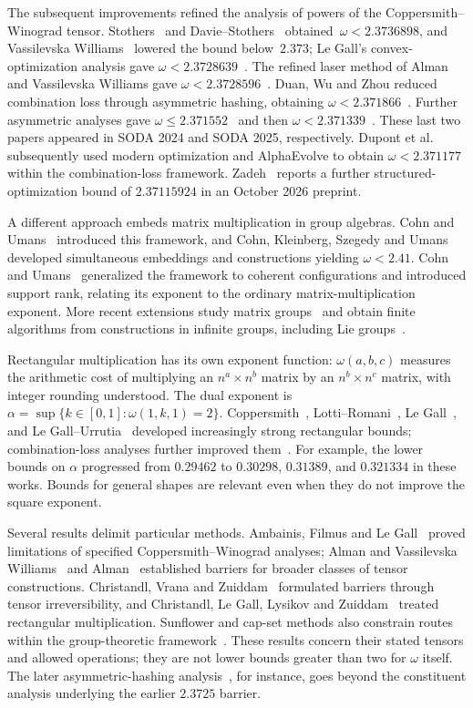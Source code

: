 \documentclass[11pt,letterpaper]{article}
\theoremstyle{definition}
\numberwithin{equation}{section}
\begin{document}
The subsequent improvements refined the analysis of powers of the Coppersmith--Winograd tensor. Stothers~\cite{Sto10} and Davie--Stothers~\cite{DS13} obtained~$\omega<2.3736898$, and Vassilevska Williams~\cite{VW12} lowered the bound below~$2.373$; Le Gall's convex-optimization analysis gave $\omega<2.3728639$~\cite{LG14}. The refined laser method of Alman and Vassilevska Williams gave $\omega<2.3728596$~\cite{AW21}. Duan, Wu and Zhou reduced combination loss through asymmetric hashing, obtaining $\omega<2.371866$~\cite{DWZ23}. Further asymmetric analyses gave $\omega\leq2.371552$~\cite{VXXZ24} and then $\omega<2.371339$~\cite{AD25}. These last two papers appeared in SODA 2024 and SODA 2025, respectively. Dupont et al.~\cite{Dup26} subsequently used modern optimization and AlphaEvolve to obtain $\omega<2.371177$ within the combination-loss framework. Zadeh~\cite{Zadeh26} reports a further structured-optimization bound of $2.37115924$ in an October 2026 preprint.

A different approach embeds matrix multiplication in group algebras. Cohn and Umans~\cite{CU03} introduced this framework, and Cohn, Kleinberg, Szegedy and Umans~\cite{CKSU05} developed simultaneous embeddings and constructions yielding $\omega<2.41$. Cohn and Umans~\cite{CU13} generalized the framework to coherent configurations and introduced support rank, relating its exponent to the ordinary matrix-multiplication exponent. More recent extensions study matrix groups~\cite{BCGPU23} and obtain finite algorithms from constructions in infinite groups, including Lie groups~\cite{BCGPU25}.

Rectangular multiplication has its own exponent function: $\omega(a,b,c)$ measures the arithmetic cost of multiplying an $n^a\times n^b$ matrix by an $n^b\times n^c$ matrix, with integer rounding understood. The dual exponent is $\alpha=\sup\{k\in[0,1]:\omega(1,k,1)=2\}$. Coppersmith~\cite{Cop82,Cop97}, Lotti--Romani~\cite{LR83}, Le Gall~\cite{LG12}, and Le Gall--Urrutia~\cite{LGU18} developed increasingly strong rectangular bounds; combination-loss analyses further improved them~\cite{LG24,VXXZ24,AD25}. For example, the lower bounds on $\alpha$ progressed from $0.29462$ to $0.30298$, $0.31389$, and $0.321334$ in these works. Bounds for general shapes are relevant even when they do not improve the square exponent.

Several results delimit particular methods. Ambainis, Filmus and Le Gall~\cite{AFL15} proved limitations of specified Coppersmith--Winograd analyses; Alman and Vassilevska Williams~\cite{AW18} and Alman~\cite{Alman21} established barriers for broader classes of tensor constructions. Christandl, Vrana and Zuiddam~\cite{CVZ21} formulated barriers through tensor irreversibility, and Christandl, Le Gall, Lysikov and Zuiddam~\cite{CGLZ25} treated rectangular multiplication. Sunflower and cap-set methods also constrain routes within the group-theoretic framework~\cite{ASU13,BCCGNSU17}. These results concern their stated tensors and allowed operations; they are not lower bounds greater than two for $\omega$ itself. The later asymmetric-hashing analysis~\cite{DWZ23}, for instance, goes beyond the constituent analysis underlying the earlier $2.3725$ barrier.
\end{document}
